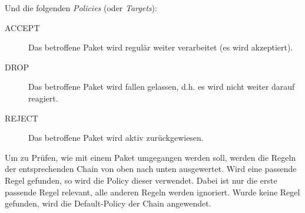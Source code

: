 				Und die folgenden \textit{Policies} (oder \textit{Targets}):
				\begin{description}
					\item[ACCEPT] Das betroffene Paket wird regulär weiter verarbeitet (es wird akzeptiert).
					\item[DROP]   Das betroffene Paket wird fallen gelassen, d.h. es wird nicht weiter darauf reagiert.
					\item[REJECT] Das betroffene Paket wird aktiv zurückgewiesen.
				\end{description}

				Um zu Prüfen, wie mit einem Paket umgegangen werden soll, werden die Regeln der entsprechenden Chain von oben nach unten ausgewertet. Wird eine passende Regel gefunden, so wird die Policy dieser verwendet. Dabei ist nur die erste passende Regel relevant, alle anderen Regeln werden ignoriert. Wurde keine Regel gefunden, wird die Default-Policy der Chain angewendet.

